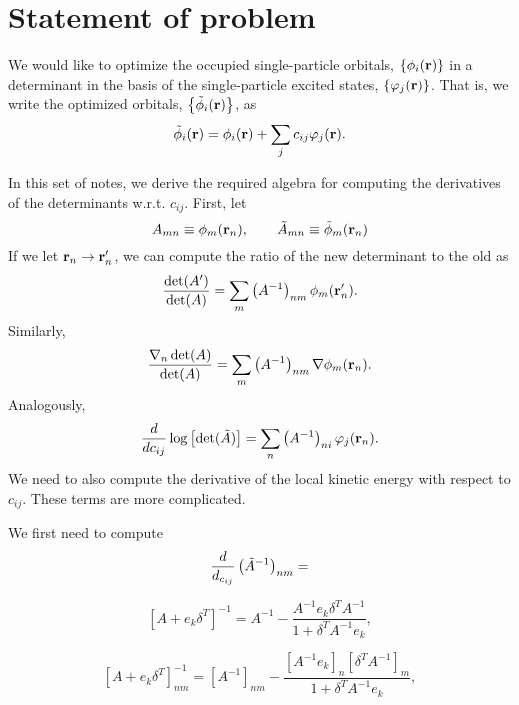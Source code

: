 \documentclass[letterpaper]{article}
\begin{document}
\section{Statement of problem}
We would like to optimize the occupied single-particle orbitals,
$\left\{\phi_i(\mathbf{r})\right\}$ in a determinant in the basis of the
single-particle excited states, $\left\{\varphi_j(\mathbf{r})\right\}$.
That is, we write the optimized orbitals,
$\left\{\tilde{\phi}_i(\mathbf{r})\right\}$, as
\begin{equation}
\tilde{\phi}_i(\mathbf{r}) = \phi_i(\mathbf{r}) + \sum_j c_{ij} \varphi_j(\mathbf{r}).
\end{equation}

In this set of notes, we derive the required algebra for computing the
derivatives of the determinants w.r.t. $c_{ij}$.  First, let
\begin{equation}
A_{mn} \equiv \phi_m(\mathbf{r}_n),\qquad \tilde{A}_{mn} \equiv \tilde{\phi}_m(\mathbf{r}_n)
\end{equation}
If we let $\mathbf{r}_n \rightarrow \mathbf{r}'_n$, we can compute the ratio of the
new determinant to the old as
\begin{equation}
\frac{\det(A')}{\det(A)} = \sum_m \left(A^{-1}\right)_{nm} \phi_m(\mathbf{r}_n').
\end{equation}
Similarly,
\begin{equation}
\frac{\nabla_n\det(A)}{\det(A)} = \sum_m \left(A^{-1}\right)_{nm} \nabla\phi_m(\mathbf{r}_n).
\end{equation}
Analogously, 
\begin{equation}
\frac{d}{d c_{ij}} \log\left[\det(\tilde{A})\right] = \sum_n
\left(A^{-1}\right)_{ni} \varphi_j(\mathbf{r}_n).
\end{equation}
We need to also compute the derivative of the local kinetic energy
with respect to $c_{ij}$.  These terms are more complicated.  


We first need to compute
\begin{equation}
\frac{d}{d_{c_{ij}}} \left(\tilde{A}^{-1}\right)_{nm} = 
\end{equation}

\begin{equation}
\left[A + e_k\delta^T\right]^{-1} = A^{-1} - \frac{A^{-1}e_k\delta^T
  A^{-1}}{1 + \delta^T A^{-1}e_k},
\end{equation}

\begin{equation}
\left[A + e_k\delta^T\right]^{-1}_{nm} = \left[A^{-1}\right]_{nm} - \frac{\left[A^{-1}e_k\right]_n\left[\delta^T
  A^{-1}\right]_m}{1 + \delta^T A^{-1}e_k},
\end{equation}
\end{document}
